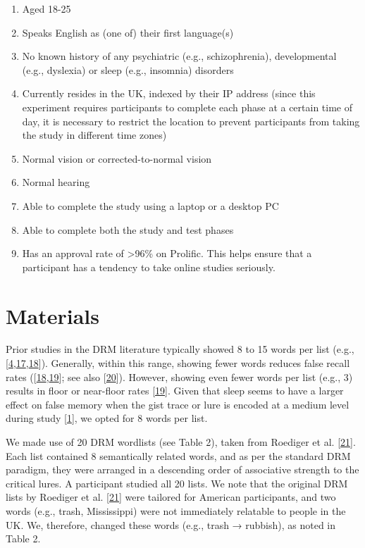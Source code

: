 \documentclass[
]{article}
\begin{document}
\begin{enumerate}
\def\labelenumi{\arabic{enumi}.}
\item
  Aged 18-25
\item
  Speaks English as (one of) their first language(s)
\item
  No known history of any psychiatric (e.g., schizophrenia), developmental (e.g., dyslexia) or sleep (e.g., insomnia) disorders
\item
  Currently resides in the UK, indexed by their IP address (since this experiment requires participants to complete each phase at a certain time of day, it is necessary to restrict the location to prevent participants from taking the study in different time zones)
\item
  Normal vision or corrected-to-normal vision
\item
  Normal hearing
\item
  Able to complete the study using a laptop or a desktop PC
\item
  Able to complete both the study and test phases
\item
  Has an approval rate of \textgreater96\% on Prolific. This helps ensure that a participant has a tendency to take online studies seriously.
\end{enumerate}

\hypertarget{materials}{%
\section{Materials}\label{materials}}

Prior studies in the DRM literature typically showed 8 to 15 words per list (e.g., {[}\protect\hyperlink{ref-fenn2009a}{4},\protect\hyperlink{ref-shaw2017a}{17},\protect\hyperlink{ref-swannell2013a}{18}{]}). Generally, within this range, showing fewer words reduces false recall rates ({[}\protect\hyperlink{ref-swannell2013a}{18},\protect\hyperlink{ref-robinson1997a}{19}{]}; see also {[}\protect\hyperlink{ref-alakbarova2021a}{20}{]}). However, showing even fewer words per list (e.g., 3) results in floor or near-floor rates {[}\protect\hyperlink{ref-robinson1997a}{19}{]}. Given that sleep seems to have a larger effect on false memory when the gist trace or lure is encoded at a medium level during study {[}\protect\hyperlink{ref-newbury2019a}{1}{]}, we opted for 8 words per list.

We made use of 20 DRM wordlists (see Table 2), taken from Roediger et al. {[}\protect\hyperlink{ref-roediger2001a}{21}{]}. Each list contained 8 semantically related words, and as per the standard DRM paradigm, they were arranged in a descending order of associative strength to the critical lures. A participant studied all 20 lists. We note that the original DRM lists by Roediger et al. {[}\protect\hyperlink{ref-roediger2001a}{21}{]} were tailored for American participants, and two words (e.g., trash, Mississippi) were not immediately relatable to people in the UK. We, therefore, changed these words (e.g., trash → rubbish), as noted in Table 2.
\end{document}
